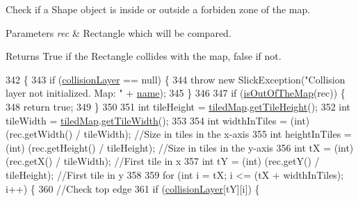 Check if a Shape object is inside or outside a forbiden zone of the map.


\begin{DoxyParams}{Parameters}
{\em rec} & Rectangle which will be compared. \\
\hline
\end{DoxyParams}
\begin{DoxyReturn}{Returns}
True if the Rectangle collides with the map, false if not. 
\end{DoxyReturn}

\begin{DoxyCode}
342                                                                         \{
343         \textcolor{keywordflow}{if} (\mbox{\hyperlink{classentities_1_1_map_af7f17d81b7e3bd4e1897f8fb7f89f855}{collisionLayer}} == null) \{
344             \textcolor{keywordflow}{throw} \textcolor{keyword}{new} SlickException(\textcolor{stringliteral}{"Collision layer not initialized. Map: "} + 
      \mbox{\hyperlink{classentities_1_1_map_a969750cbb3acef375d33040e29be91f0}{name}});
345         \}
346 
347         \textcolor{keywordflow}{if} (\mbox{\hyperlink{classentities_1_1_map_ac0f565ccdac5df088ea9424a6c218b14}{isOutOfTheMap}}(rec)) \{
348             \textcolor{keywordflow}{return} \textcolor{keyword}{true};
349         \}
350 
351         \textcolor{keywordtype}{int} tileHeight = \mbox{\hyperlink{classentities_1_1_map_a94a743ccd80946422fcbdb5ba1cc966b}{tiledMap}}.\mbox{\hyperlink{classorg_1_1newdawn_1_1slick_1_1tiled_1_1_tiled_map_a03d0f5ea72a93c1939e97deea19a1d3a}{getTileHeight}}();
352         \textcolor{keywordtype}{int} tileWidth = \mbox{\hyperlink{classentities_1_1_map_a94a743ccd80946422fcbdb5ba1cc966b}{tiledMap}}.\mbox{\hyperlink{classorg_1_1newdawn_1_1slick_1_1tiled_1_1_tiled_map_a44dd7389139c646e87d056fdd1e44232}{getTileWidth}}();
353 
354         \textcolor{keywordtype}{int} widthInTiles = (int) (rec.getWidth() / tileWidth);   \textcolor{comment}{//Size in tiles in the x-axis}
355         \textcolor{keywordtype}{int} heightInTiles = (int) (rec.getHeight() / tileHeight);   \textcolor{comment}{//Size in tiles in the y-axis}
356         \textcolor{keywordtype}{int} tX = (int) (rec.getX() / tileWidth); \textcolor{comment}{//First tile in x}
357         \textcolor{keywordtype}{int} tY = (int) (rec.getY() / tileHeight);    \textcolor{comment}{//First tile in y}
358 
359         \textcolor{keywordflow}{for} (\textcolor{keywordtype}{int} i = tX; i <= (tX + widthInTiles); i++) \{
360             \textcolor{comment}{//Check top edge}
361             \textcolor{keywordflow}{if} (\mbox{\hyperlink{classentities_1_1_map_af7f17d81b7e3bd4e1897f8fb7f89f855}{collisionLayer}}[tY][i]) \{

\end{DoxyCode}
